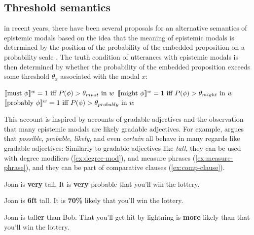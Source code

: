 \subsection{Threshold semantics}

in recent years, there have been several proposals for an alternative semantics of epistemic modals based on the idea that the meaning of 
epistemic modals is determined by the position of the probability of the embedded proposition on a probability scale
\cite{e.g., Swanson2006,Yalcin2010,Lassiter2017}. The truth condition of utterances with epistemic modals is then determined by whether
the probability of the embedded proposition exceeds some threshold $\theta_x$ associated with the modal $x$:

\begin{exe}
\ex $\llbracket\mbox{must }\phi\rrbracket^{w} = 1 \mbox{ iff $P(\phi) > \theta_{must}$ in $w$} $
\ex $\llbracket\mbox{might } \phi\rrbracket^{w} = 1 \mbox{ iff $P(\phi) > \theta_{might}$ in $w$} $
\ex $\llbracket\mbox{probably } \phi\rrbracket^{w} = 1 \mbox{ iff $P(\phi) > \theta_{probably}$ in $w$} $
\end{exe}

This account is inspired by accounts of gradable adjectives \cite{e.g., Kennedy2007} and the observation that many 
epistemic modals are likely gradable adjectives. For example, \cite{Lassiter2017} argues that \textit{possible}, \textit{probable},
\textit{likely}, and even \textit{certain} all behave in many regards like gradable adjectives: Similarly to gradable adjectives like \textit{tall}, 
they can be used with degree modifiers  (\ref{ex:degree-mod}), and measure phrases (\ref{ex:measure-phrase}), and they can be part of comparative clauses (\ref{ex:comp-clause}).

\begin{exe}
\ex \label{ex:degree-mod} \begin{xlist}
\ex Joan is \textbf{very} tall.
\ex It is \textbf{very} probable that you'll win the lottery.
\end{xlist}
\ex \label{ex:measure-phrase} \begin{xlist}
\ex Joan is \textbf{6ft} tall.
\ex It is \textbf{70\%} likely that you'll win the lottery.
\end{xlist}
\ex  \label{ex:comp-clause}  \begin{xlist}
\ex Joan is tall\textbf{er} than Bob.
\ex That you'll get hit by lightning is \textbf{more} likely than that you'll win the lottery.
\end{xlist}
\end{exe}

